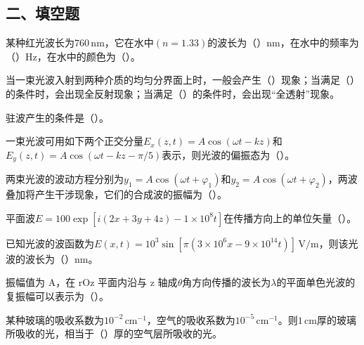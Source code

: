 \documentclass[standard, analysis, notocnum]{ExBook}
\newcommand{\answerarea}[1][8cm]{%
  \par\vspace{2mm}%
  \noindent{\color{themeColor!35}\rule{\linewidth}{0.4pt}}\par
  \noindent\begin{minipage}[t][#1][t]{\linewidth}\vspace{0pt}\end{minipage}\par
  \noindent{\color{themeColor!35}\rule{\linewidth}{0.4pt}}\par
}
\begin{document}
\subsection{二、填空题}
\begin{qitems}
\begin{bbox}
\qitem 某种红光波长为$760\,\mathrm{nm}$，它在水中$(n=1.33)$的波长为（\hspace{1.6em}）nm，在水中的频率为（\hspace{1.6em}）Hz，在水中的颜色为（\hspace{1.6em}）。
\answerarea[3.5cm]
\end{bbox}
\begin{bbox}
\qitem 当一束光波入射到两种介质的均匀分界面上时，一般会产生（\hspace{1.6em}）现象；当满足（\hspace{1.6em}）的条件时，会出现全反射现象；当满足（\hspace{1.6em}）的条件时，会出现“全透射”现象。
\answerarea[3.5cm]
\end{bbox}
\begin{bbox}
\qitem 驻波产生的条件是（\hspace{1.6em}）。
\answerarea[3.5cm]
\end{bbox}
\begin{bbox}
\qitem 一束光波可用如下两个正交分量$E_{x}(z,t)=A\cos (\omega t-kz)$和$E_{y}(z,t)=A\cos (\omega t-kz-\pi /5)$表示，则光波的偏振态为（\hspace{1.6em}）。
\answerarea[3.5cm]
\end{bbox}
\begin{bbox}
\qitem 两束光波的波动方程分别为$y_{1}=A\cos (\omega t+\varphi_{1})$和$y_{2}=A\cos (\omega t+\varphi_{2})$，两波叠加将产生干涉现象，它们的合成波的振幅为（\hspace{1.6em}）。
\answerarea[3.5cm]
\end{bbox}
\begin{bbox}
\qitem 平面波$E=100\exp [i(2x+3y+4z)-1\times 10^{8}t]$在传播方向上的单位矢量（\hspace{1.6em}）。
\answerarea[3.5cm]
\end{bbox}
\begin{bbox}
\qitem 已知光波的波函数为$E(x,t)=10^{3}\sin [\pi (3\times 10^{6}x-9\times 10^{14}t)]\,\mathrm{V/m}$，则该光波的波长为（\hspace{1.6em}）nm。
\answerarea[3.5cm]
\end{bbox}
\begin{bbox}
\qitem 振幅值为 A，在 rOz 平面内沿与 z 轴成$\theta$角方向传播的波长为$\lambda$的平面单色光波的复振幅可以表示为（\hspace{1.6em}）。
\answerarea[3.5cm]
\end{bbox}
\begin{bbox}
\qitem 某种玻璃的吸收系数为$10^{-2}\,\mathrm{cm}^{-1}$，空气的吸收系数为$10^{-5}\,\mathrm{cm}^{-1}$。则$1\,\mathrm{cm}$厚的玻璃所吸收的光，相当于（\hspace{1.6em}）厚的空气层所吸收的光。
\answerarea[3.5cm]
\end{bbox}
\end{qitems}
\end{document}
